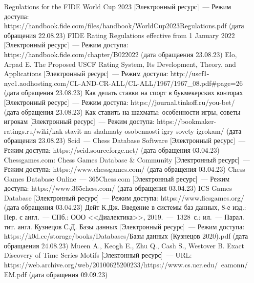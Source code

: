 \begin{thebibliography}{}
	 Regulations for the FIDE World Cup 2023 [Электронный ресурс]~--- Режим доступа: https://handbook.fide.com/files/handbook/WorldCup2023Regulations.pdf (дата обращения 22.08.23)
	 FIDE Rating Regulations effective from 1 January 2022 [Электронный ресурс]~--- Режим доступа: https://handbook.fide.com/chapter/B022022 (дата обращаения 23.08.23)
	 Elo, Arpad E. The Proposed USCF Rating System, Its Development, Theory, and Applications [Электронный ресурс]~--- Режим доступа: http://uscf1-nyc1.aodhosting.com/CL-AND-CR-ALL/CL-ALL/1967/1967\_08.pdf\#page=26 (дата обращения 23.08.23)
	 Как делать ставки на спорт в букмекерских конторах [Электронный ресурс]~--- Режим доступа: https://journal.tinkoff.ru/you-bet/ (дата обращения 23.08.23)
	 Как ставить на шахматы: особенности игры, советы игрокам [Электронный ресурс]~--- Режим доступа: https://bookmaker-ratings.ru/wiki/kak-stavit-na-shahmaty-osobennosti-igry-sovety-igrokam/ (дата обращения 23.08.23)
	 Scid~--- Chess Database Software [Электронный ресурс]~--- Режим доступа: https://scid.sourceforge.net/ (дата обращения 03.04.23)
	 Chessgames.com: Chess Games Database \& Community [Электронный ресурс]~--- Режим доступа: https://www.chessgames.com/ (дата обращения 03.04.23)
	 Chess Games Database Online~--- 365Chess.com [Электронный ресурс]~--- Режим доступа: https://www.365chess.com/ (дата обращения 03.04.23)
	 ICS Games Database [Электронный ресурс]~--- Режим доступа: https://www.ficsgames.org/ (дата обращения 03.04.23)
	 Дейт К.Дж. Введение в системы баз данных, 8-е изд.: Пер. с англ.~--- СПб.: ООО <<Диалектика>>, 2019.~---~1328~с.: ил.~--- Парал. тит. англ.
	 Кузнецов С.Д. Базы данных [Электронный ресурс]~--- Режим доступа: https://k0d.cc/storage/books/Databases/Базы данных (Кузнецов 2020).pdf (дата обращаения 24.08.23)
	 Mueen A., Keogh E., Zhu Q., Cash S., Westover B. Exact Discovery of Time Series Motifs [Электонный ресурс]~--- URL: https://web.archive.org/web/20100625200233/https://www.cs.ucr.edu/~eamonn/EM.pdf (дата обращения 09.09.23)
\end{thebibliography}
